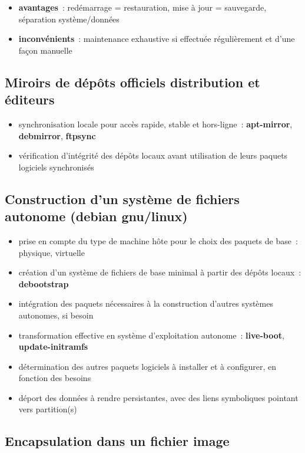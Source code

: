 \documentclass[10pt]{article}
\newenvironment{itmz}{\begin{itemize}
\setlength{\itemsep}{0em}
}{\end{itemize}}
\begin{document}
\begin{itmz}
\item{\textbf{avantages} : redémarrage = restauration, mise à jour = sauvegarde, séparation système/données}
\item{\textbf{inconvénients} : maintenance exhaustive si effectuée régulièrement et d’une façon manuelle}
\end{itmz}

\subsection{Miroirs de dépôts officiels distribution et éditeurs}

\begin{itmz}
\item{synchronisation locale pour accès rapide, stable et hors-ligne : \textbf{apt-mirror}, \textbf{debmirror}, \textbf{ftpsync}}
\item{vérification d’intégrité des dépôts locaux avant utilisation de leurs paquets logiciels synchronisés}
\end{itmz}

\subsection{Construction d’un système de fichiers autonome (debian gnu/linux)}

\begin{itmz}
\item{prise en compte du type de machine hôte pour le choix des paquets de base : physique, virtuelle}
\item{création d’un système de fichiers de base minimal à partir des dépôts locaux : \textbf{debootstrap}}
\item{intégration des paquets nécessaires à la construction d’autres systèmes autonomes, si besoin}
\item{transformation effective en système d’exploitation autonome : \textbf{live-boot}, \textbf{update-initramfs}}
\item{détermination des autres paquets logiciels à installer et à configurer, en fonction des besoins}
\item{déport des données à rendre persistantes, avec des liens symboliques pointant vers partition(s)}
\end{itmz}

\subsection{Encapsulation dans un fichier image}
\end{document}
